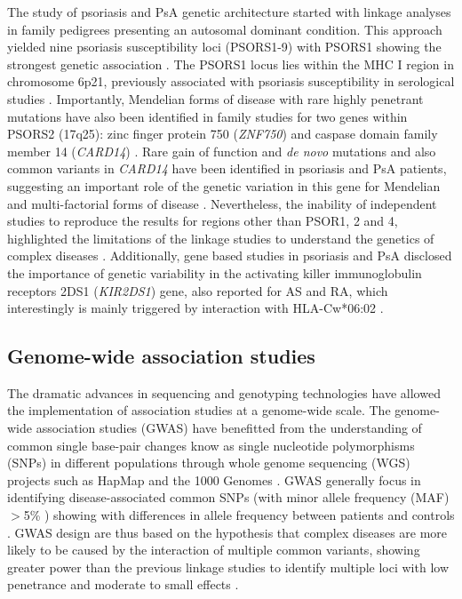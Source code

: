 The study of psoriasis and PsA genetic architecture started with linkage analyses in family pedigrees presenting an autosomal dominant condition. This approach yielded nine psoriasis susceptibility loci (PSORS1-9) with PSORS1 showing the strongest genetic association \parencite{Capon2017, International2003}. The PSORS1 locus lies within the MHC I region in chromosome 6p21, previously associated with psoriasis susceptibility in serological studies \parencite{Rusell1972, Tiilikainen1980}. Importantly, Mendelian forms of disease with rare highly penetrant mutations have also been identified in family studies for two genes within PSORS2 (17q25): zinc finger protein 750 (\textit{ZNF750}) and caspase domain family member 14 (\textit{CARD14}) \parencite{Tomfohrde1994,Jordan2012}. Rare gain of function and \textit{de novo} mutations and also common variants in \textit{CARD14} have been identified in psoriasis and PsA patients, suggesting an important role of the genetic variation in this gene for Mendelian and multi-factorial forms of disease \parencite {Jordan2012, Tsoi2012}. %
Nevertheless, the inability of independent studies to reproduce the results for regions other than PSOR1, 2 and 4, highlighted the limitations of the linkage studies to understand the genetics of complex diseases \parencite{Capon2017}. Additionally, gene based studies in psoriasis and PsA disclosed the importance of genetic variability in the activating killer immunoglobulin receptors 2DS1 (\textit{KIR2DS1}) gene, also reported for AS and RA, which interestingly is mainly triggered by interaction with HLA-Cw*06:02 \parencite{Łuszczek2004, Williams2005,Carter2007, Yen2001}.  


\subsection{Genome-wide association studies}

The dramatic advances in sequencing and genotyping technologies have allowed the implementation of association studies at a genome-wide scale. The genome-wide association studies (GWAS) have benefitted from the understanding of common single base-pair changes know as single nucleotide polymorphisms (SNPs) in different populations through whole genome sequencing (WGS) projects such as HapMap \parencite{The international HapMaP Consortium} and the 1000 Genomes \parencite{The 1000 Genomes}. GWAS generally focus in identifying disease-associated common SNPs (with minor allele frequency (MAF) ${>}$5\% ) showing with differences in allele frequency between patients and controls \parencite{Ku2010}. GWAS design are thus based on the hypothesis that complex diseases are more likely to be caused by the interaction of multiple common variants, showing greater power than the previous linkage studies to identify multiple loci with low penetrance and moderate to small effects \parencite{Schork2009, Cui2010}. 

